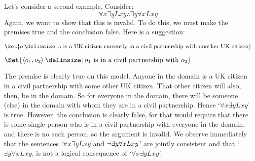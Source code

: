 Let's consider a second example. Consider:
	$$\forall x \exists y Lxy \therefore \exists y \forall x Lxy$$
Again, we want to show that this is invalid. To do this, we must make the premises true and the conclusion false. Here is a suggestion:
	\begin{interp}
		\item[\domain] $\Set{o \given o\text{ is a UK citizen currently in a civil partnership with another UK citizen}}$
		\item[\denote{L}] $\Set{\langle o_1,o_2\rangle \given  o_1\text{ is in a civil partnership with }o_2}$
	\end{interp}
The premise is clearly true on this model. Anyone in the domain is a UK citizen in a civil partnership with some other UK citizen. That other citizen will also, then, be in the domain. So for everyone in the domain, there will be someone (else) in the domain with whom they are in a civil partnership. Hence `$\forall x \exists y Lxy$' is true. However, the conclusion is clearly false, for that would require that there is some single person who is in a civil partnership with everyone in the domain, and there is no such person, so the argument is invalid. We observe immediately that the sentences `$\forall x \exists y Lxy$ and $\neg\exists y \forall x Lxy$' are jointly consistent and that `$\exists y \forall x Lxy$, is not a logical consequence of `$\forall x \exists y Lxy$'.


